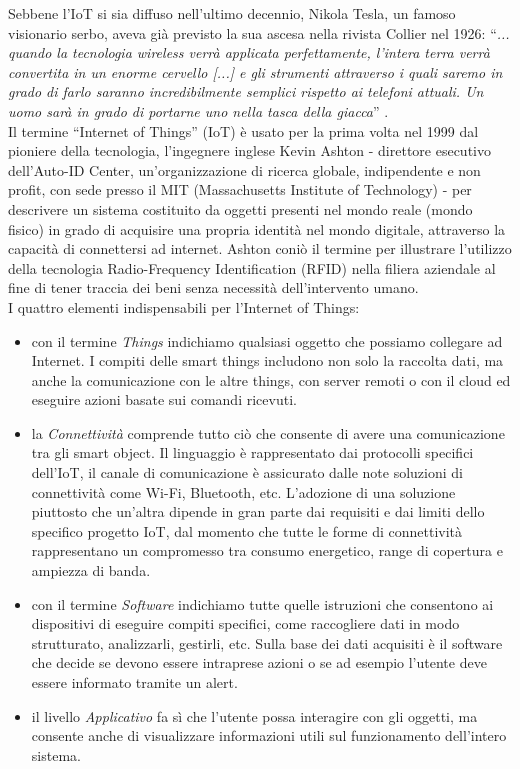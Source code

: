 \noindent Sebbene l'IoT si sia diffuso nell'ultimo decennio, Nikola Tesla, un famoso visionario serbo, aveva già previsto la sua ascesa nella rivista Collier nel 1926: ``\textit{... quando la tecnologia wireless verrà applicata perfettamente, l'intera terra verrà convertita in un enorme cervello [...] e gli strumenti attraverso i quali saremo in grado di farlo saranno incredibilmente semplici rispetto ai telefoni attuali. Un uomo sarà in grado di portarne uno nella tasca della giacca}'' \cite{kennedy1926woman}.\\
Il termine ``Internet of Things'' (IoT) è usato per la prima volta nel 1999 dal pioniere della tecnologia, l'ingegnere inglese Kevin Ashton - direttore esecutivo dell'Auto-ID Center, un'organizzazione di ricerca globale, indipendente e non profit, con sede presso il MIT (Massachusetts Institute of Technology) - per descrivere un sistema costituito da oggetti presenti nel mondo reale (mondo fisico) in grado di acquisire una propria identità nel mondo digitale, attraverso la capacità di connettersi ad internet. Ashton coniò il termine per illustrare l'utilizzo della tecnologia Radio-Frequency Identification (RFID) nella filiera aziendale al fine di tener traccia dei beni senza necessità dell'intervento umano.\\

\noindent I quattro elementi indispensabili per l'Internet of Things: 
\begin{itemize}
    \item con il termine \textit{Things} indichiamo qualsiasi oggetto che possiamo collegare ad Internet. I compiti delle smart things includono non solo la raccolta dati, ma anche la comunicazione con le altre things, con server remoti o con il cloud ed eseguire azioni basate sui comandi ricevuti.
    
    \item la \textit{Connettività} comprende tutto ciò che consente di avere una comunicazione tra gli smart object. Il linguaggio è rappresentato dai protocolli specifici dell'IoT, il canale di comunicazione è assicurato dalle note soluzioni di connettività come Wi-Fi, Bluetooth, etc. L'adozione di una soluzione piuttosto che un'altra dipende in gran parte dai requisiti e dai limiti dello specifico progetto IoT, dal momento che tutte le forme di connettività rappresentano un compromesso tra consumo energetico, range di copertura e ampiezza di banda. 
    
    \item con il termine \textit{Software} indichiamo tutte quelle istruzioni che consentono ai dispositivi di eseguire compiti specifici, come raccogliere dati in modo strutturato, analizzarli, gestirli, etc. Sulla base dei dati acquisiti è il software che decide se devono essere intraprese azioni o se ad esempio l'utente deve essere informato tramite un alert.
    
    \item il livello \textit{Applicativo} fa sì che l'utente possa interagire con gli oggetti, ma consente anche di visualizzare informazioni utili sul funzionamento dell'intero sistema. 
\end{itemize}

